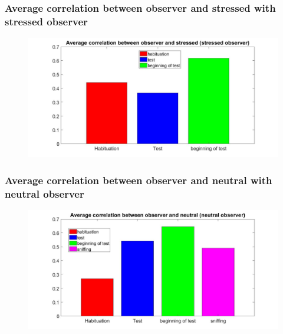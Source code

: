 \documentclass{beamer}
\begin{document}
\begin{frame}
\frametitle{ Average correlation between observer and stressed with stressed observer}



\begin{figure}[H]
	\begin{center}
		\hspace*{-1.7cm}
		\includegraphics[scale=.32]{avg_corr_stress2.jpg} 
	\end{center}  
	
	
\end{figure}

\end{frame}

\begin{frame}
\frametitle{ Average correlation between observer and neutral with neutral observer}



\begin{figure}[H]
	\begin{center}
		\hspace*{-1.7cm}
		\includegraphics[scale=.32]{avg_corr_neut.jpg} 
	\end{center}  
	
	
\end{figure}

\end{frame}
\end{document}
